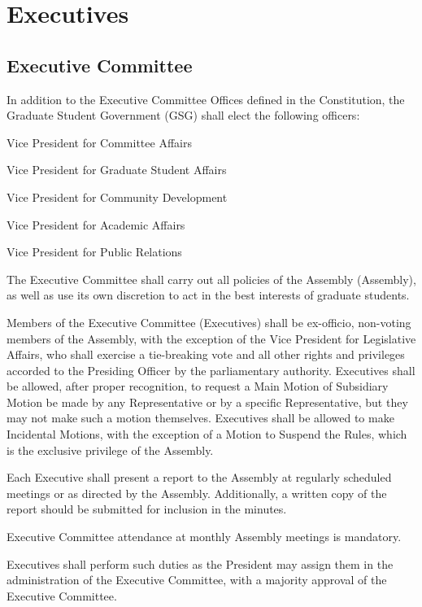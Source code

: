 \chapter{Executives}

\section{Executive Committee}
\begin{bylaws-number}
  \item In addition to the Executive Committee Offices defined in the Constitution, the Graduate Student Government (GSG) shall elect the following officers:
  \begin{bylaws-number}
    \item Vice President for Committee Affairs
    \item Vice President for Graduate Student Affairs
    \item Vice President for Community Development
    \item Vice President for Academic Affairs
    \item Vice President for Public Relations
  \end{bylaws-number}
  \item The Executive Committee shall carry out all policies of the Assembly (Assembly), as well as use its own discretion to act in the best interests of graduate students.
  \item Members of the Executive Committee (Executives) shall be ex-officio, non-voting members of the Assembly, with the exception of the Vice President for Legislative Affairs, who shall exercise a tie-breaking vote and all other rights and privileges accorded to the Presiding Officer by the parliamentary authority. Executives shall be allowed, after proper recognition, to request a Main Motion of Subsidiary Motion be made by any Representative or by a specific Representative, but they may not make such a motion themselves. Executives shall be allowed to make Incidental Motions, with the exception of a Motion to Suspend the Rules, which is the exclusive privilege of the Assembly.
  \item Each Executive shall present a report to the Assembly at regularly scheduled meetings or as directed by the Assembly. Additionally, a written copy of the report should be submitted for inclusion in the minutes.
  \item Executive Committee attendance at monthly Assembly meetings is mandatory.
  \item Executives shall perform such duties as the President may assign them in the administration of the Executive Committee, with a majority approval of the Executive Committee.

\end{bylaws-number}
